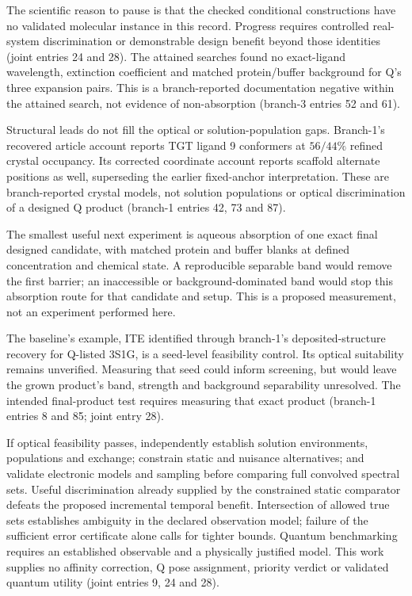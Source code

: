 \documentclass{article}
\begin{document}
The scientific reason to pause is that the checked conditional constructions have no validated molecular instance in this record. Progress requires controlled real-system discrimination or demonstrable design benefit beyond those identities (joint entries 24 and 28). The attained searches found no exact-ligand wavelength, extinction coefficient and matched protein/buffer background for Q's three expansion pairs. This is a branch-reported documentation negative within the attained search, not evidence of non-absorption (branch-3 entries 52 and 61).

Structural leads do not fill the optical or solution-population gaps. Branch-1's recovered article account reports TGT ligand 9 conformers at \(56/44\%\) refined crystal occupancy. Its corrected coordinate account reports scaffold alternate positions as well, superseding the earlier fixed-anchor interpretation. These are branch-reported crystal models, not solution populations or optical discrimination of a designed Q product (branch-1 entries 42, 73 and 87).

The smallest useful next experiment is aqueous absorption of one exact final designed candidate, with matched protein and buffer blanks at defined concentration and chemical state. A reproducible separable band would remove the first barrier; an inaccessible or background-dominated band would stop this absorption route for that candidate and setup. This is a proposed measurement, not an experiment performed here.

The baseline's example, ITE identified through branch-1's deposited-structure recovery for Q-listed 3S1G, is a seed-level feasibility control. Its optical suitability remains unverified. Measuring that seed could inform screening, but would leave the grown product's band, strength and background separability unresolved. The intended final-product test requires measuring that exact product (branch-1 entries 8 and 85; joint entry 28).

If optical feasibility passes, independently establish solution environments, populations and exchange; constrain static and nuisance alternatives; and validate electronic models and sampling before comparing full convolved spectral sets. Useful discrimination already supplied by the constrained static comparator defeats the proposed incremental temporal benefit. Intersection of allowed true sets establishes ambiguity in the declared observation model; failure of the sufficient error certificate alone calls for tighter bounds. Quantum benchmarking requires an established observable and a physically justified model. This work supplies no affinity correction, Q pose assignment, priority verdict or validated quantum utility (joint entries 9, 24 and 28).

\clearpage


\end{document}
